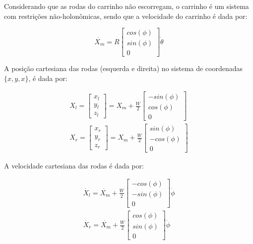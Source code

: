 \documentclass[10pt]{article}
\begin{document}
\quad Considerando que as rodas do carrinho não escorregam,
o carrinho é um sistema com restrições não-holonômicas,
sendo que a velocidade do carrinho é dada por:

\begin{equation}
    \dot{X_m} = R
    \begin{bmatrix}
        cos(\phi) \\
        sin(\phi) \\
        0
    \end{bmatrix}
    \dot{\theta}
\end{equation}

\quad A posição cartesiana das rodas (esquerda e direita) no sistema de coordenadas $\{x, y, x\}$,
é dada por:

\begin{equation}
\begin{aligned}
    X_l =
    \begin{bmatrix}
        x_l \\
        y_l \\
        z_l
    \end{bmatrix} =
    X_m + \frac{W}{2}
    \begin{bmatrix}
        - sin(\phi) \\
        cos(\phi) \\
        0
    \end{bmatrix}  \\
    X_r =
    \begin{bmatrix}
        x_r \\
        y_r \\
        z_r
    \end{bmatrix} =
    X_m + \frac{W}{2}
    \begin{bmatrix}
        sin(\phi) \\
        - cos(\phi) \\
        0
    \end{bmatrix}
\end{aligned}
\end{equation}

\quad A velocidade cartesiana das rodas é dada por:

\begin{equation}
    \begin{aligned}
        \dot{X_l} =
        \dot{X_m} + \frac{W}{2}
        \begin{bmatrix}
            - cos(\phi) \\
            - sin(\phi) \\
            0
        \end{bmatrix} \dot{\phi} \\
        \dot{X_r} =
        \dot{X_m} + \frac{W}{2}
        \begin{bmatrix}
            cos(\phi) \\
            sin(\phi) \\
            0
        \end{bmatrix} \dot{\phi}
    \end{aligned}
\end{equation}
\end{document}
